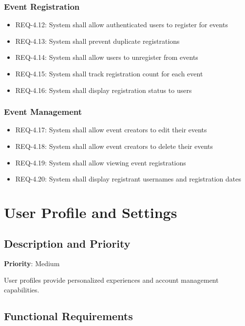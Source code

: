 \documentclass{scrreprt}
\begin{document}
\subsubsection{Event Registration}
\begin{itemize}
\item REQ-4.12: System shall allow authenticated users to register for events
\item REQ-4.13: System shall prevent duplicate registrations
\item REQ-4.14: System shall allow users to unregister from events
\item REQ-4.15: System shall track registration count for each event
\item REQ-4.16: System shall display registration status to users
\end{itemize}

\subsubsection{Event Management}
\begin{itemize}
\item REQ-4.17: System shall allow event creators to edit their events
\item REQ-4.18: System shall allow event creators to delete their events
\item REQ-4.19: System shall allow viewing event registrations
\item REQ-4.20: System shall display registrant usernames and registration dates
\end{itemize}

\section{User Profile and Settings}

\subsection{Description and Priority}
\textbf{Priority}: Medium

User profiles provide personalized experiences and account management capabilities.

\subsection{Functional Requirements}
\end{document}
